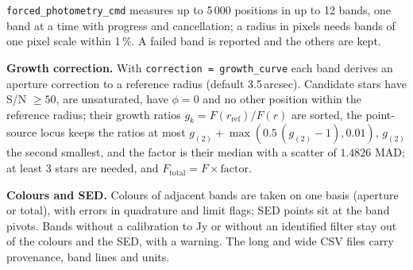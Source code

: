 \documentclass[11pt,a4paper]{article}
\newcommand{\code}[1]{\texttt{\small #1}}
\begin{document}
    \code{forced\_photometry\_cmd} measures up to 5\,000 positions in up to 12 bands, one band at a time with progress and cancellation; a radius in pixels needs bands of one pixel scale within 1\,\%. A failed band is reported and the others are kept.

    \textbf{Growth correction.} With \code{correction = growth\_curve} each band derives an aperture correction to a reference radius (default 3.5\,arcsec). Candidate stars have S/N $\ge 50$, are unsaturated, have $\phi = 0$ and no other position within the reference radius; their growth ratios $g_k = F(r_{\text{ref}})/F(r)$ are sorted, the point-source locus keeps the ratios at most $g_{(2)} + \max(0.5\,(g_{(2)} - 1), 0.01)$, $g_{(2)}$ the second smallest, and the factor is their median with a scatter of $1.4826$ MAD; at least 3 stars are needed, and $F_{\text{total}} = F \times \text{factor}$.

    \textbf{Colours and SED.} Colours of adjacent bands are taken on one basis (aperture or total), with errors in quadrature and limit flags; SED points sit at the band pivots. Bands without a calibration to Jy or without an identified filter stay out of the colours and the SED, with a warning. The long and wide CSV files carry provenance, band lines and units.
\end{document}
